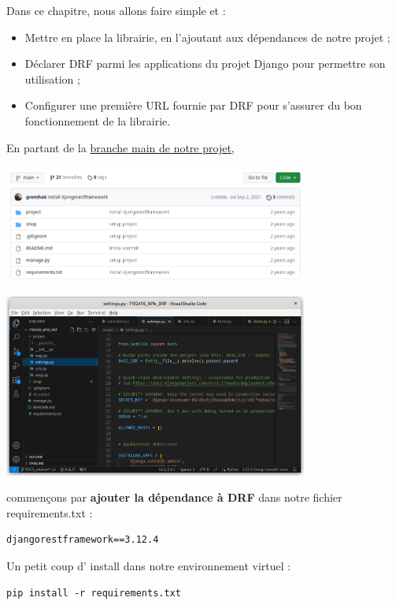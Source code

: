 Dans ce chapitre, nous allons faire simple et :
\begin{itemize}
\item Mettre en place la librairie, en l’ajoutant aux dépendances de notre projet ;
\item Déclarer DRF parmi les applications du projet Django pour permettre son utilisation ;
\item Configurer une première URL fournie par DRF pour s’assurer du bon fonctionnement de la librairie.
\end{itemize}
En partant de la \href{https://github.com/OpenClassrooms-Student-Center/7192416_APIs_DRF}{branche main de notre projet},
\begin{center}
\includegraphics[width=10cm]{images/image02.png}
\end{center}
\begin{center}
\includegraphics[width=10cm]{images/image03.png}
\end{center}
 commençons par {\bf ajouter la dépendance à DRF} dans notre fichier {\color{monOrange}requirements.txt}  :
\begin{verbatim}
djangorestframework==3.12.4
\end{verbatim}

Un petit coup d’ install  dans notre environnement virtuel :
\begin{verbatim}
pip install -r requirements.txt
\end{verbatim}

